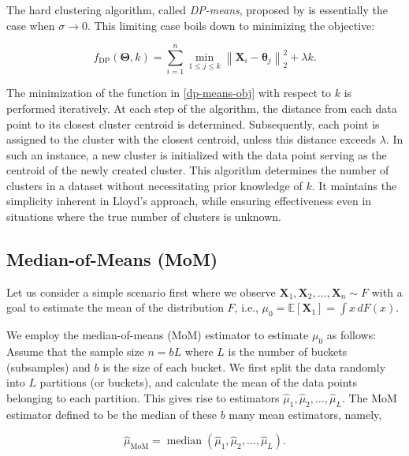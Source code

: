 \documentclass[12pt]{article}
\newcommand{\bX}{\boldsymbol{X}}
\newcommand{\bTheta}{\boldsymbol{\Theta}}
\begin{document}
The hard clustering algorithm, called \textit{DP-means}, proposed by \cite{DP-Means} is essentially the case when $\sigma \to 0$. This limiting case boils down to minimizing the objective:

\begin{equation}\label{dp-means-obj}
    f_{\operatorname{DP}} (\bTheta, k)=\sum_{i=1}^n \min _{1 \leq j \leq k}\left\|{\bX}_i-\boldsymbol{\theta}_j\right\|_2^2+\lambda k.
\end{equation}

The minimization of the function in \eqref{dp-means-obj} with respect to $k$ is performed iteratively. At each step of the algorithm, the distance from each data point to its closest cluster centroid is determined. Subsequently, each point is assigned to the cluster with the closest centroid, unless this distance exceeds $\lambda$. In such an instance, a new cluster is initialized with the data point serving as the centroid of the newly created cluster. This algorithm determines the number of clusters in a dataset without necessitating prior knowledge of $k$. It maintains the simplicity inherent in Lloyd's approach, while ensuring effectiveness even in situations where the true number of clusters is unknown.


\subsection{Median-of-Means (MoM)}

Let us consider a simple scenario first where we observe $\bX_1,\bX_2,\ldots,\bX_n\sim F$ with a goal to estimate the mean of the distribution $F$, i.e., $\mu_0=\mathbb{E} [\bX_1]=\int x\,dF(x)$.

We employ the median-of-means (MoM) estimator to estimate $\mu_0$ as follows: Assume that the sample size $n=bL$ where $L$ is the number of buckets (subsamples) and $b$ is the size of each bucket. We first split the data randomly into $L$ partitions (or buckets), and calculate the mean of the data points belonging to each partition. This gives rise to estimators $\hat{\mu}_1,\hat{\mu}_2,\ldots,\hat{\mu}_L$. The MoM estimator defined to be the median of these $b$ many mean estimators, namely,

\begin{equation}\label{MoM-defn}
\hat{\mu}_{\text{MoM}}=\operatorname{median} (\hat{\mu}_1,\hat{\mu}_2,\ldots,\hat{\mu}_L).
\end{equation}
\end{document}
